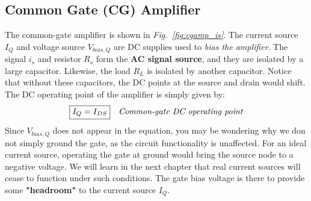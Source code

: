 \subsection{Common Gate (CG) Amplifier}
The common-gate amplifier is shown in \emph{Fig.~\ref{fig:cgamp_is}}.  The current source $I_Q$ and voltage source $V_{bias,Q}$ are DC supplies used to \textit{bias the amplifier}.  The signal $i_s$ and resistor $R_s$ form the \textbf{AC signal source}, and they are isolated by a large capacitor.  Likewise, the load $R_L$ is isolated by another capacitor.  Notice that without these capacitors, the DC points at the source and drain would shift.  The DC operating point of the amplifier is simply given by:
\begin{align}
	\Aboxed{I_Q &= I_{DS}} &\textit{Common-gate DC operating point}
\end{align}
Since $V_{bias,Q}$ does not appear in the equation, you may be wondering why we don not simply ground the gate, as the circuit functionality is unaffected.  For an ideal current source, operating the gate at ground would bring the source node to a negative voltage.  We will learn in the next chapter that real current sources will cease to function under such conditions.  The gate bias voltage is there to provide some \textbf{"headroom"} to the current source $I_Q$.
